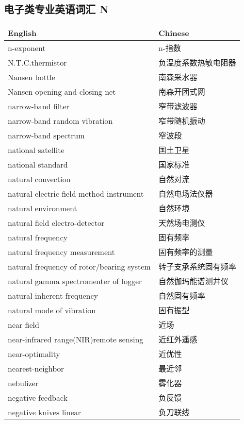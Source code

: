 \documentclass[
]{article}
\begin{document}
\hypertarget{ux7535ux5b50ux7c7bux4e13ux4e1aux82f1ux8bedux8bcdux6c47-n}{%
\subsection{\texorpdfstring{电子类专业英语词汇 N
}{电子类专业英语词汇 N }}\label{ux7535ux5b50ux7c7bux4e13ux4e1aux82f1ux8bedux8bcdux6c47-n}}

\begin{longtable}[]{@{}ll@{}}
\toprule()
English & Chinese \\
\midrule()
\endhead
n-exponent & n-指数 \\
N.T.C.thermistor & 负温度系数热敏电阻器 \\
Nansen bottle & 南森采水器 \\
Nansen opening-and-closing net & 南森开团式网 \\
narrow-band filter & 窄带滤波器 \\
narrow-band random vibration & 窄带随机振动 \\
narrow-band spectrum & 窄波段 \\
national satellite & 国土卫星 \\
national standard & 国家标准 \\
natural convection & 自然对流 \\
natural electric-field method instrument & 自然电场法仪器 \\
natural environment & 自然环境 \\
natural field electro-detector & 天然场电测仪 \\
natural frequency & 固有频率 \\
natural frequency measurement & 固有频率的测量 \\
natural frequency of rotor/bearing system & 转子支承系统固有频率 \\
natural gamma spectromenter of logger & 自然伽玛能谱测井仪 \\
natural inherent frequency & 自然固有频率 \\
natural mode of vibration & 固有振型 \\
near field & 近场 \\
near-infrared range(NIR)remote sensing & 近红外遥感 \\
near-optimality & 近优性 \\
nearest-neighbor & 最近邻 \\
nebulizer & 雾化器 \\
negative feedback & 负反馈 \\
negative knives linear & 负刀联线 \\

\end{longtable}
\end{document}

